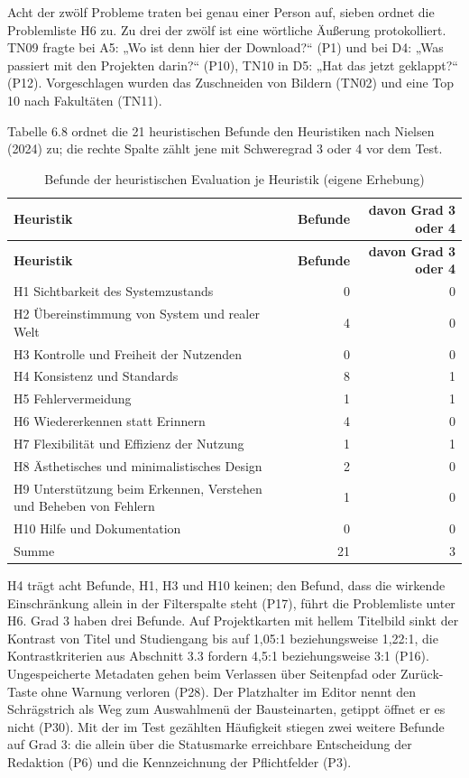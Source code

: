 Acht der zwölf Probleme traten bei genau einer Person auf, sieben ordnet die Problemliste H6 zu. Zu drei der zwölf ist eine wörtliche Äußerung protokolliert. TN09 fragte bei A5: „Wo ist denn hier der Download?“ (P1) und bei D4: „Was passiert mit den Projekten darin?“ (P10), TN10 in D5: „Hat das jetzt geklappt?“ (P12). Vorgeschlagen wurden das Zuschneiden von Bildern (TN02) und eine Top 10 nach Fakultäten (TN11).

Tabelle 6.8 ordnet die 21 heuristischen Befunde den Heuristiken nach Nielsen (2024) zu; die rechte Spalte zählt jene mit Schweregrad 3 oder 4 vor dem Test.

\begingroup
\small
\setlength{\tabcolsep}{4pt}
\begin{longtable}{@{}L{8.6cm}rr@{}}
	\caption[Befunde der heuristischen Evaluation je Heuristik]{Befunde der heuristischen Evaluation je Heuristik (eigene Erhebung)}
	\label{tab:heuristische-befunde}\\
	\toprule
	\textbf{Heuristik} & \textbf{Befunde} & \textbf{davon Grad 3 oder 4} \\
	\midrule
	\endfirsthead
	\toprule
	\textbf{Heuristik} & \textbf{Befunde} & \textbf{davon Grad 3 oder 4} \\
	\midrule
	\endhead
	\bottomrule
	\endfoot
	H1 Sichtbarkeit des Systemzustands & 0 & 0 \\
	H2 Übereinstimmung von System und realer Welt & 4 & 0 \\
	H3 Kontrolle und Freiheit der Nutzenden & 0 & 0 \\
	H4 Konsistenz und Standards & 8 & 1 \\
	H5 Fehlervermeidung & 1 & 1 \\
	H6 Wiedererkennen statt Erinnern & 4 & 0 \\
	H7 Flexibilität und Effizienz der Nutzung & 1 & 1 \\
	H8 Ästhetisches und minimalistisches Design & 2 & 0 \\
	H9 Unterstützung beim Erkennen, Verstehen und Beheben von Fehlern & 1 & 0 \\
	H10 Hilfe und Dokumentation & 0 & 0 \\
	\midrule
	Summe & 21 & 3 \\
\end{longtable}
\endgroup

H4 trägt acht Befunde, H1, H3 und H10 keinen; den Befund, dass die wirkende Einschränkung allein in der Filterspalte steht (P17), führt die Problemliste unter H6. Grad 3 haben drei Befunde. Auf Projektkarten mit hellem Titelbild sinkt der Kontrast von Titel und Studiengang bis auf 1,05:1 beziehungsweise 1,22:1, die Kontrastkriterien aus Abschnitt 3.3 fordern 4,5:1 beziehungsweise 3:1 (P16). Ungespeicherte Metadaten gehen beim Verlassen über Seitenpfad oder Zurück-Taste ohne Warnung verloren (P28). Der Platzhalter im Editor nennt den Schrägstrich als Weg zum Auswahlmenü der Bausteinarten, getippt öffnet er es nicht (P30). Mit der im Test gezählten Häufigkeit stiegen zwei weitere Befunde auf Grad 3: die allein über die Statusmarke erreichbare Entscheidung der Redaktion (P6) und die Kennzeichnung der Pflichtfelder (P3).

